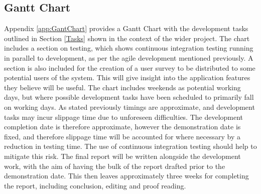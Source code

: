 \documentclass[titlepage,hidelinks,10pt]{article}
\begin{document}
\subsection{Gantt Chart}\label{GanttChart}
Appendix \ref{app:GantChart} provides a Gantt Chart with the development tasks outlined in Section \ref{Tasks} shown in the context of the wider project. The chart includes a section on testing, which shows continuous integration testing running in parallel to development, as per the agile development mentioned previously. A section is also included for the creation of a user survey to be distributed to some potential users of the system. This will give insight into the application features they believe will be useful. The chart includes weekends as potential working days, but where possible development tasks have been scheduled to primarily fall on working days. As stated previously timings are approximate, and development tasks may incur slippage time due to unforeseen difficulties. The development completion date is therefore approximate, however the demonstration date is fixed, and therefore slippage time will be accounted for where necessary by a reduction in testing time. The use of continuous integration testing should help to mitigate this risk. The final report will be written alongside the development work, with the aim of having the bulk of the report drafted prior to the demonstration date. This then leaves approximately three weeks for completing the report, including conclusion, editing and proof reading.
\end{document}
